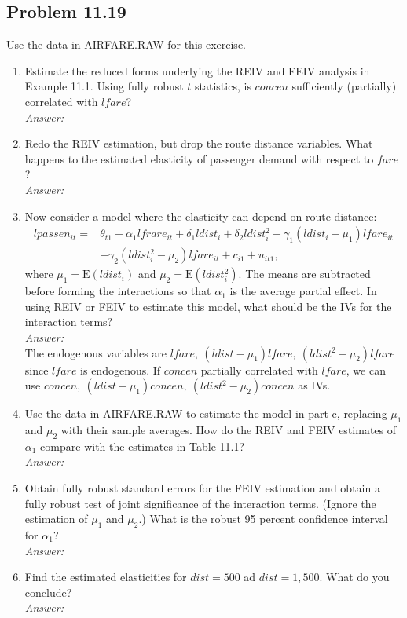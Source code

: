 \documentclass[10pt]{article}
\newcommand{\E}{\text{E}}
\begin{document}
\subsection*{Problem 11.19}
Use the data in AIRFARE.RAW for this exercise.
\begin{enumerate}[label=\alph*.]
\item Estimate the reduced forms underlying the REIV and FEIV analysis in Example 11.1. Using fully robust $t$ statistics, is $concen$ sufficiently (partially) correlated with $lfare$?
\\ \textit{Answer:}\\


\item Redo the REIV estimation, but drop the route distance variables. What happens to the estimated elasticity of passenger demand with respect to $fare$?
\\ \textit{Answer:}\\


\item Now consider a model where the elasticity can depend on route distance:
\begin{align*}
    lpassen_{it}=&\theta_{t1}+\alpha_1 lfrare_{it}+\delta_1 ldist_i+\delta_2 ldist_i^2+\gamma_1(ldist_i-\mu_1)lfare_{it}\\
    &+\gamma_2(ldist_i^2-\mu_2)lfare_{it}+c_{i1}+u_{it1},
\end{align*}
where $\mu_1=\E(ldist_i)$ and $\mu_2=\E(ldist_i^2)$. The means are subtracted before forming the interactions so that $\alpha_1$ is the average partial effect. In using REIV or FEIV to estimate this model, what should be the IVs for the interaction terms?
\\ \textit{Answer:}\\
The endogenous variables are $lfare,\ (ldist-\mu_1)lfare,\ (ldist^2-\mu_2)lfare$ since $lfare$ is endogenous. If $concen$ partially correlated with $lfare$, we can use $concen,\ (ldist-\mu_1)concen,\ (ldist^2-\mu_2)concen$ as IVs.

\item Use the data in AIRFARE.RAW to estimate the model in part c, replacing $\mu_1$ and $\mu_2$ with their sample averages. How do the REIV and FEIV estimates of $\alpha_1$ compare with the estimates in Table 11.1?
\\ \textit{Answer:}\\


\item Obtain fully robust standard errors for the FEIV estimation and obtain a fully robust test of joint significance of the interaction terms. (Ignore the estimation of $\mu_1$ and $\mu_2$.) What is the robust 95 percent confidence interval for $\alpha_1$?
\\ \textit{Answer:}\\


\item Find the estimated elasticities for $dist=500$ ad $dist=1,500.$ What do you conclude?
\\ \textit{Answer:}\\


\end{enumerate}
\end{document}
